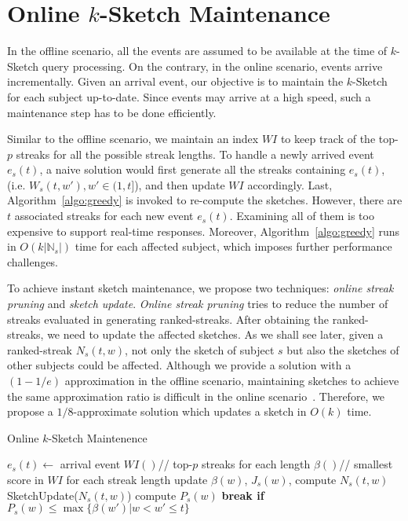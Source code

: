 \section {Online $k$-Sketch Maintenance}\label{sec:online}
In the offline scenario, all the events are assumed 
to be available at the time of $k$-Sketch query processing. 
On the contrary, in the online scenario,
events arrive incrementally. 
Given an arrival event, our objective is to maintain the $k$-Sketch 
for each subject up-to-date. Since events may arrive at a high speed, %
such a maintenance step has to be done efficiently.  

Similar to the offline scenario, we maintain an index $WI$  to keep 
track of the top-$p$ streaks 
for all the possible streak lengths.
To handle a newly arrived event $e_s(t)$, a naive solution would first generate
all the streaks containing $e_s(t)$, (i.e. $W_s(t,w'), w'\in(1,t]$), and then
update $WI$ accordingly.
Last, Algorithm~\ref{algo:greedy} is invoked to re-compute the sketches. 
However, there are $t$ associated streaks for each new event $e_s(t)$. 
Examining all of them is too expensive to support real-time responses. 
Moreover, Algorithm~\ref{algo:greedy} runs in $O(k|\mathbb{N}_s|)$ 
time for each affected subject, which imposes further performance challenges. 

To achieve instant sketch maintenance, we propose two techniques: \emph{online streak pruning} and \emph{sketch update}. 
\emph{Online streak pruning} tries to reduce the number of streaks evaluated in generating ranked-streaks. 
After obtaining the ranked-streaks, we need to update the affected sketches.
As we shall see later, given a ranked-streak $N_s(t,w)$, 
not only the sketch of subject $s$ but also the sketches of other subjects could be affected. 
Although we provide a solution with a $(1-1/e)$ approximation in the offline scenario, 
maintaining sketches to achieve the same approximation ratio 
is difficult in the online scenario~\cite{Alonerbuch2003The,Awerbuch1996Making}. 
Therefore, we propose a $1/8$-approximate solution which updates a sketch in $O(k)$ time.

\begin{algorithm}[h]
\caption{Online $k$-Sketch Maintenence}\label{algo:online_overview}
\begin{algorithmic}[1]
\Require $e_s(t) \gets $ arrival event
\State $WI()$// top-$p$ streaks for each length
\State $\beta()$// smallest score in $WI$ for each streak length
\State update $\beta(w)$, $J_s(w)$, compute $N_s(t,w)$ 
\State SketchUpdate($N_s(t,w)$)
\EndIf
\State compute $P_s(w)$
\State \bf{break} if $P_s(w)\leq \max\{\beta(w')|w < w' \leq t\}$
\EndFor
\end{algorithmic}
\end{algorithm}

